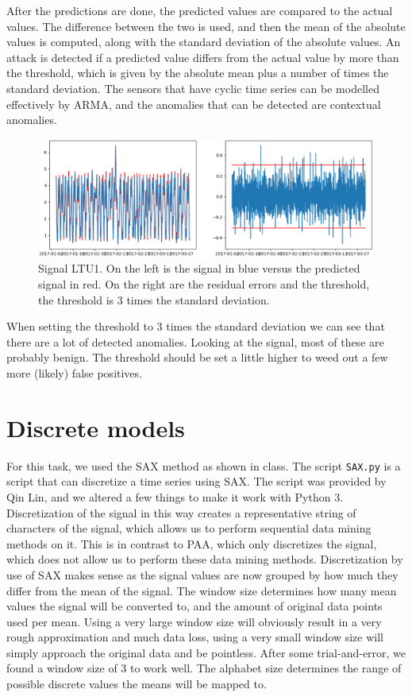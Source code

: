 \documentclass[]{article}
\begin{document}
After the predictions are done, the predicted values are compared to the actual values. The difference between the two is used, and then the mean of the absolute values is computed, along with the standard deviation of the absolute values. An attack is detected if a predicted value differs from the actual value by more than the threshold, which is given by the absolute mean plus a number of times the standard deviation. The sensors that have cyclic time series can be modelled effectively by ARMA, and the anomalies that can be detected are contextual anomalies.

\begin{center}
\begin{figure}[H]
  \includegraphics[width=16cm, keepaspectratio]{./visuallizations/arma_3stddev_LTU1.png}
  \caption{Signal LTU1. On the left is the signal in blue versus the predicted signal in red. On the right are the residual errors and the threshold, the threshold is 3 times the standard deviation.}
  \label{signals}
\end{figure}
\end{center}

When setting the threshold to 3 times the standard deviation we can see that there are a lot of detected anomalies. Looking at the signal, most of these are probably benign. The threshold should be set a little higher to weed out a few more (likely) false positives.

\section{Discrete models}
For this task, we used the SAX method as shown in class. The script \texttt{SAX.py} is a script that can discretize a time series using SAX. The script was provided by Qin Lin, and we altered a few things to make it work with Python 3. Discretization of the signal in this way creates a representative string of characters of the signal, which allows us to perform sequential data mining methods on it. This is in contrast to PAA, which only discretizes the signal, which does not allow us to perform these data mining methods. Discretization by use of SAX makes sense as the signal values are now grouped by how much they differ from the mean of the signal. The window size determines how many mean values the signal will be converted to, and the amount of original data points used per mean. Using a very large window size will obviously result in a very rough approximation and much data loss, using a very small window size will simply approach the original data and be pointless. After some trial-and-error, we found a window size of 3 to work well. The alphabet size determines the range of possible discrete values the means will be mapped to. 
\end{document}
